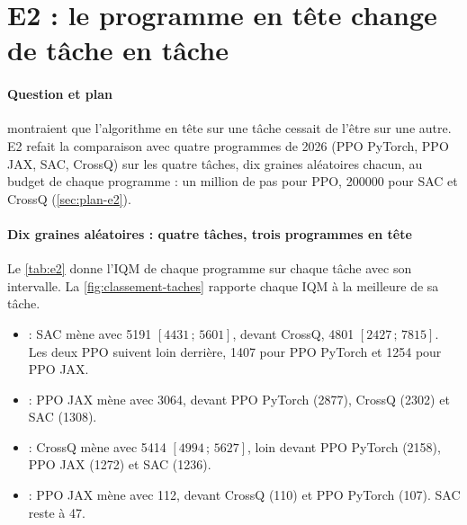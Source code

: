 \section{E2 : le programme en tête change de tâche en tâche}\label{sec:e2}

\paragraph{Question et plan}
\textcite{henderson2018matters} montraient que l'algorithme en tête sur une tâche cessait de l'être sur une
autre. E2 refait la comparaison avec quatre programmes de 2026 (PPO PyTorch, PPO JAX, SAC, CrossQ) sur les
quatre tâches, dix graines aléatoires chacun, au budget de chaque programme : un million de pas pour PPO,
\num{200000} pour SAC et CrossQ (\cref{sec:plan-e2}).

\paragraph{Dix graines aléatoires : quatre tâches, trois programmes en tête}
Le \cref{tab:e2} donne l'IQM de chaque programme sur chaque tâche avec son intervalle. La
\cref{fig:classement-taches} rapporte chaque IQM à la meilleure de sa tâche.
\begin{itemize}
  \item {} : SAC mène avec \num{5191} $[\num{4431}\,;\,\num{5601}]$, devant CrossQ, \num{4801}
    $[\num{2427}\,;\,\num{7815}]$. Les deux PPO suivent loin derrière, \num{1407} pour PPO PyTorch et \num{1254}
    pour PPO JAX.
  \item {} : PPO JAX mène avec \num{3064}, devant PPO PyTorch (\num{2877}), CrossQ (\num{2302}) et
    SAC (\num{1308}).
  \item {} : CrossQ mène avec \num{5414} $[\num{4994}\,;\,\num{5627}]$, loin devant PPO PyTorch
    (\num{2158}), PPO JAX (\num{1272}) et SAC (\num{1236}).
  \item {} : PPO JAX mène avec 112, devant CrossQ (110) et PPO PyTorch (107). SAC reste à 47.
\end{itemize}


